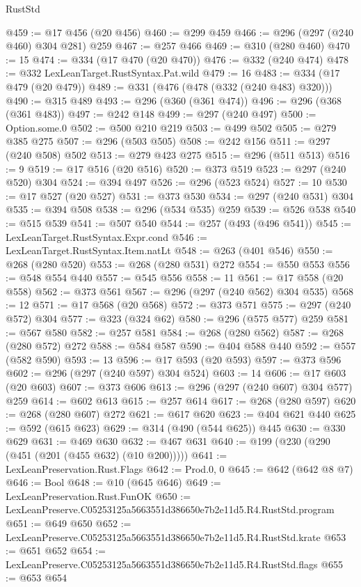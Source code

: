 \begin{lexlean}{RustStd}
\begin{coremodule}
@459 := @17 @456 (@20 @456)
@460 := @299 @459
@466 := @296 (@297 (@240 @460) @304 @281) @259
@467 := @257 @466
@469 := @310 (@280 @460)
@470 := 15
@474 := @334 (@17 @470 (@20 @470))
@476 := @332 (@240 @474)
@478 := @332 LexLeanTarget.RustSyntax.Pat.wild
@479 := 16
@483 := @334 (@17 @479 (@20 @479))
@489 := @331 (@476 (@478 (@332 (@240 @483) @320)))
@490 := @315 @489
@493 := @296 (@360 (@361 @474))
@496 := @296 (@368 (@361 @483))
@497 := @242 @148
@499 := @297 (@240 @497)
@500 := Option.some.{0}
@502 := @500 @210 @219
@503 := @499 @502
@505 := @279 @385 @275
@507 := @296 (@503 @505)
@508 := @242 @156
@511 := @297 (@240 @508) @502
@513 := @279 @423 @275
@515 := @296 (@511 @513)
@516 := 9
@519 := @17 @516 (@20 @516)
@520 := @373 @519
@523 := @297 (@240 @520) @304
@524 := @394 @497
@526 := @296 (@523 @524)
@527 := 10
@530 := @17 @527 (@20 @527)
@531 := @373 @530
@534 := @297 (@240 @531) @304
@535 := @394 @508
@538 := @296 (@534 @535) @259
@539 := @526 @538
@540 := @515 @539
@541 := @507 @540
@544 := @257 (@493 (@496 @541))
@545 := LexLeanTarget.RustSyntax.Expr.cond
@546 := LexLeanTarget.RustSyntax.Item.natLt
@548 := @263 (@401 @546)
@550 := @268 (@280 @520)
@553 := @268 (@280 @531) @272
@554 := @550 @553
@556 := @548 @554 @440
@557 := @545 @556
@558 := 11
@561 := @17 @558 (@20 @558)
@562 := @373 @561
@567 := @296 (@297 (@240 @562) @304 @535)
@568 := 12
@571 := @17 @568 (@20 @568)
@572 := @373 @571
@575 := @297 (@240 @572) @304
@577 := @323 (@324 @62)
@580 := @296 (@575 @577) @259
@581 := @567 @580
@582 := @257 @581
@584 := @268 (@280 @562)
@587 := @268 (@280 @572) @272
@588 := @584 @587
@590 := @404 @588 @440
@592 := @557 (@582 @590)
@593 := 13
@596 := @17 @593 (@20 @593)
@597 := @373 @596
@602 := @296 (@297 (@240 @597) @304 @524)
@603 := 14
@606 := @17 @603 (@20 @603)
@607 := @373 @606
@613 := @296 (@297 (@240 @607) @304 @577) @259
@614 := @602 @613
@615 := @257 @614
@617 := @268 (@280 @597)
@620 := @268 (@280 @607) @272
@621 := @617 @620
@623 := @404 @621 @440
@625 := @592 (@615 @623)
@629 := @314 (@490 (@544 @625)) @445
@630 := @330 @629
@631 := @469 @630
@632 := @467 @631
@640 := @199 (@230 (@290 (@451 (@201 (@455 @632) (@10 @200)))))
@641 := LexLeanPreservation.Rust.Flags
@642 := Prod.{0, 0}
@645 := @642 (@642 @8 @7)
@646 := Bool
@648 := @10 (@645 @646)
@649 := LexLeanPreservation.Rust.FunOK
@650 := LexLeanPreserve.C05253125a5663551d386650e7b2e11d5.R4.RustStd.program
@651 := @649 @650
@652 := LexLeanPreserve.C05253125a5663551d386650e7b2e11d5.R4.RustStd.krate
@653 := @651 @652
@654 := LexLeanPreserve.C05253125a5663551d386650e7b2e11d5.R4.RustStd.flags
@655 := @653 @654

\end{coremodule}
\end{lexlean}

